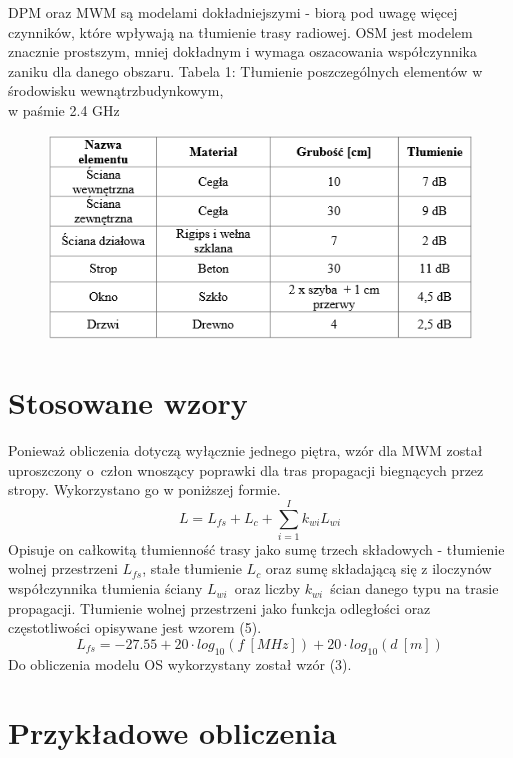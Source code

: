 \documentclass[12pt, a4paper, oneside]{article}
\begin{document}
DPM oraz MWM są modelami dokładniejszymi - biorą pod uwagę więcej czynników, które wpływają na tłumienie trasy radiowej. OSM jest modelem znacznie prostszym, mniej dokładnym i wymaga oszacowania współczynnika zaniku dla danego obszaru.
\clearpage
\noindent Tabela 1: Tłumienie poszczególnych elementów w środowisku wewnątrzbudynkowym,\\w paśmie 2.4 GHz
\begin{figure}[h]
\centering
\includegraphics[scale=0.7]{tab1.png}
\end{figure}
\section{Stosowane wzory}
\indent\indent Ponieważ obliczenia dotyczą wyłącznie jednego piętra, wzór dla MWM został uproszczony o~człon wnoszący poprawki dla tras propagacji biegnących przez stropy. Wykorzystano go w poniższej formie.
\begin{equation}
L=L_{fs}+L_c+\sum_{i=1}^Ik_{wi}L_{wi}
\end{equation}
\indent\indent Opisuje on całkowitą tłumienność trasy jako sumę trzech składowych - tłumienie wolnej przestrzeni $L_{fs}$, stałe tłumienie $L_c$ oraz sumę składającą się z iloczynów współczynnika tłumienia ściany $L_{wi}$~oraz liczby $k_{wi}$~ścian danego typu na trasie propagacji. Tłumienie wolnej przestrzeni jako funkcja odległości oraz częstotliwości opisywane jest wzorem (5).
\begin{equation}
L_{fs}=-27.55+20\cdot log_{10}(f~[MHz])+20\cdot log_{10}(d~[m])
\end{equation}
\indent\indent Do obliczenia modelu OS wykorzystany został wzór (3).
\section{Przykładowe obliczenia}
\end{document}
